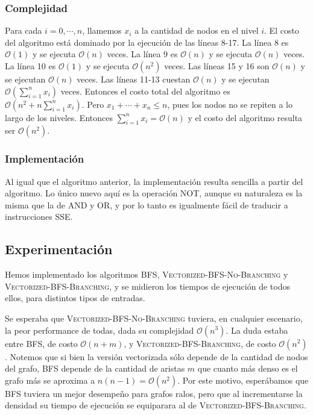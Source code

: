 \subsubsection{Complejidad}
Para cada $i = 0, \cdots, n$, llamemos $x_i$ a la cantidad de nodos en el nivel $i$. El costo del algoritmo está dominado por la ejecución de las líneas 8-17. La línea 8 es $\mathcal{O}(1)$ y se ejecuta $\mathcal{O}(n)$ veces. La línea 9 es $\mathcal{O}(n)$ y se ejecuta $\mathcal{O}(n)$ veces. La línea 10 es $\mathcal{O}(1)$ y se ejecuta $\mathcal{O}(n^2)$ veces. Las líneas 15 y 16 son $\mathcal{O}(n)$ y se ejecutan $\mathcal{O}(n)$ veces. Las líneas 11-13 cuestan $\mathcal{O}(n)$ y se ejecutan $\mathcal{O}\left(\sum_{i = 1}^{n} {x_i}\right)$ veces. Entonces el costo total del algoritmo es $\mathcal{O}\left(n^2 + n \sum_{i = 1}^{n}{x_i}\right)$. Pero $x_1 + \cdots + x_n \leq n$, pues los nodos no se repiten a lo largo de los niveles. Entonces $\sum_{i = 1}^{n} {x_i} = \mathcal{O}(n)$ y el costo del algoritmo resulta ser $\mathcal{O}(n^2)$.

\subsubsection{Implementación}

Al igual que el algoritmo anterior, la implementación resulta sencilla a partir del algoritmo. Lo único nuevo aquí es la operación \textsf{NOT}, aunque su naturaleza es la misma que la de \textsf{AND} y \textsf{OR}, y por lo tanto es igualmente fácil de traducir a instrucciones SSE.

\subsection{Experimentación}

Hemos implementado los algoritmos \textsc{BFS}, \textsc{Vectorized-BFS-No-Branching} y \textsc{Vectorized-BFS-Branching}, y se midieron los tiempos de ejecución de todos ellos, para distintos tipos de entradas.

Se esperaba que \textsc{Vectorized-BFS-No-Branching} tuviera, en cualquier escenario, la peor performance de todas, dada su complejidad $\mathcal{O}(n^3)$. La duda estaba entre \textsc{BFS}, de costo $\mathcal{O}(n + m)$, y \textsc{Vectorized-BFS-Branching}, de costo $\mathcal{O}(n^2)$. Notemos que si bien la versión vectorizada sólo depende de la cantidad de nodos del grafo, \textsc{BFS} depende de la cantidad de aristas $m$ que cuanto más denso es el grafo más se aproxima a $n(n - 1) = \mathcal{O}(n^2)$. Por este motivo, esperábamos que \textsc{BFS} tuviera un mejor desempeño para grafos ralos, pero que al incrementarse la densidad su tiempo de ejecución se equiparara al de \textsc{Vectorized-BFS-Branching}.

